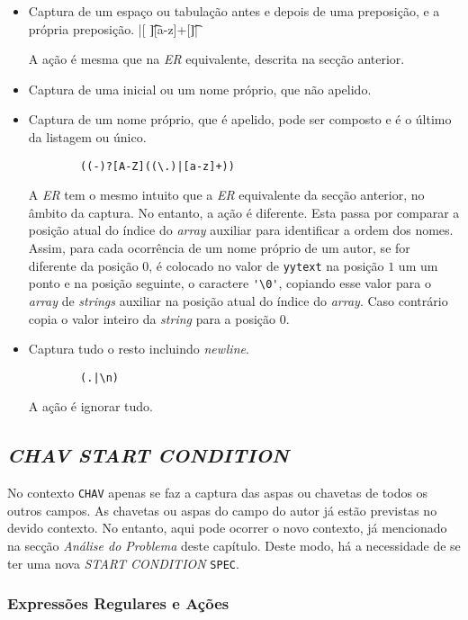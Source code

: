 \begin{itemize}
	
	 \item Captura de um espaço ou tabulação antes e depois de uma
		 preposição, e a própria preposição.
		|[ \t][a-z]+[\t ]|

		 A ação é mesma que na \emph{ER} equivalente, descrita na secção anterior.

	 \item Captura de uma inicial ou um nome próprio, que não apelido.

	 \item Captura de um nome próprio, que é apelido, pode ser composto
		 e é o último da listagem ou único.
    \begin{verbatim}
		((-)?[A-Z]((\.)|[a-z]+))
    \end{verbatim}
		A \emph{ER} tem o mesmo intuito que a \emph{ER} equivalente da secção
		anterior, no âmbito da captura. No entanto, a ação é diferente.
		Esta passa por comparar a posição atual do índice do \emph{array} auxiliar
		para identificar a ordem dos nomes. Assim, para cada ocorrência de um nome
		próprio de um autor, se for diferente da posição $0$, é colocado no valor de
		\texttt{yytext} na posição $1$ um um ponto e na posição seguinte,
		o caractere \verb|'\0'|, copiando esse valor para o \emph{array} de
		\emph{strings} auxiliar na posição atual do índice do \emph{array}. Caso
		contrário copia o valor inteiro da \emph{string} para a posição $0$.

	 \item Captura tudo o resto incluindo \emph{newline}.
    \begin{verbatim}
		(.|\n)
    \end{verbatim}
	A ação é ignorar tudo.


\end{itemize}


\subsection{\emph{CHAV \emph{START CONDITION}}}

No contexto \texttt{CHAV} apenas se faz a captura das aspas ou chavetas de todos
os outros campos. As chavetas ou aspas do campo do autor já estão previstas  no
devido contexto. No entanto, aqui pode ocorrer o novo contexto, já mencionado na
secção \emph{Análise do Problema} deste capítulo. Deste modo, há a necessidade
de se ter uma nova \emph{START CONDITION} \texttt{SPEC}.

\subsubsection{Expressões Regulares e Ações}


